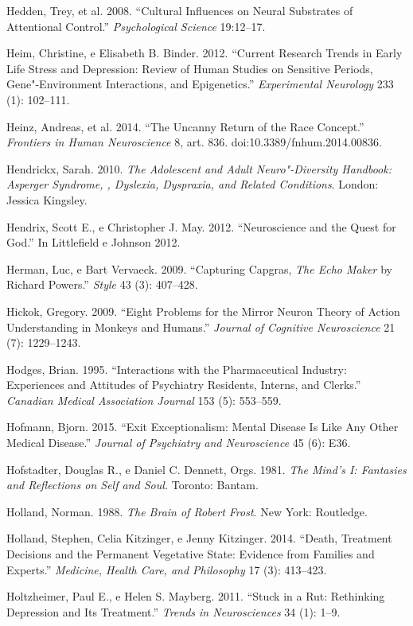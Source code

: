 {\begin{Parskip}
Hedden, Trey, et al. 2008. ``Cultural Influences on Neural Substrates of
Attentional Control.'' \emph{Psychological Science} 19:12--17.

Heim, Christine, e Elisabeth B. Binder. 2012. ``Current Research Trends
in Early Life Stress and Depression: Review of Human Studies on
Sensitive Periods, Gene"-Environment Interactions, and Epigenetics.''
\emph{Experimental Neurology} 233 (1): 102--111.

Heinz, Andreas, et al. 2014. ``The Uncanny Return of the Race Concept.''
\emph{Frontiers in Human Neuroscience} 8, art. 836.
doi:10.3389/fnhum.2014.00836.

Hendrickx, Sarah. 2010. \emph{The Adolescent and Adult Neuro"-Diversity
Handbook: Asperger Syndrome, , Dyslexia, Dyspraxia, and Related
Conditions}. London: Jessica Kingsley.

Hendrix, Scott E., e Christopher J. May. 2012. ``Neuroscience and the
Quest for God.'' In Littlefield e Johnson 2012.

Herman, Luc, e Bart Vervaeck. 2009. ``Capturing Capgras, \emph{The Echo
Maker} by Richard Powers.'' \emph{Style} 43 (3): 407--428.

Hickok, Gregory. 2009. ``Eight Problems for the Mirror Neuron Theory of
Action Understanding in Monkeys and Humans.'' \emph{Journal of Cognitive
Neuroscience} 21 (7): 1229--1243.

Hodges, Brian. 1995. ``Interactions with the Pharmaceutical Industry:
Experiences and Attitudes of Psychiatry Residents, Interns, and
Clerks.'' \emph{Canadian Medical Association Journal} 153 (5): 553--559.

Hofmann, Bjorn. 2015. ``Exit Exceptionalism: Mental Disease Is Like Any
Other Medical Disease.'' \emph{Journal of Psychiatry and Neuroscience}
45 (6): E36.

Hofstadter, Douglas R., e Daniel C. Dennett, Orgs. 1981. \emph{The
Mind's I: Fantasies and Reflections on Self and Soul.} Toronto: Bantam.

Holland, Norman. 1988. \emph{The Brain of Robert Frost}. New York:
Routledge.

Holland, Stephen, Celia Kitzinger, e Jenny Kitzinger. 2014. ``Death,
Treatment Decisions and the Permanent Vegetative State: Evidence from
Families and Experts.'' \emph{Medicine, Health Care, and Philosophy} 17
(3): 413--423.

Holtzheimer, Paul E., e Helen S. Mayberg. 2011. ``Stuck in a Rut:
Rethinking Depression and Its Treatment.'' \emph{Trends in
Neurosciences} 34 (1): 1--9.


\end{Parskip}}
